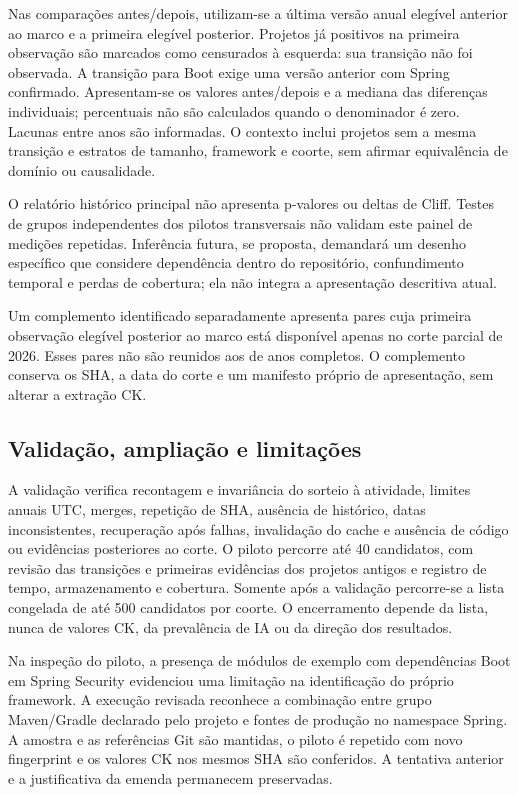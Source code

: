 Nas comparações antes/depois, utilizam-se a última versão anual elegível anterior ao marco e a primeira elegível posterior. Projetos já positivos na primeira observação são marcados como censurados à esquerda: sua transição não foi observada. A transição para Boot exige uma versão anterior com Spring confirmado. Apresentam-se os valores antes/depois e a mediana das diferenças individuais; percentuais não são calculados quando o denominador é zero. Lacunas entre anos são informadas. O contexto inclui projetos sem a mesma transição e estratos de tamanho, framework e coorte, sem afirmar equivalência de domínio ou causalidade.

O relatório histórico principal não apresenta p-valores ou deltas de Cliff. Testes de grupos independentes dos pilotos transversais não validam este painel de medições repetidas. Inferência futura, se proposta, demandará um desenho específico que considere dependência dentro do repositório, confundimento temporal e perdas de cobertura; ela não integra a apresentação descritiva atual.

Um complemento identificado separadamente apresenta pares cuja primeira observação elegível posterior ao marco está disponível apenas no corte parcial de 2026. Esses pares não são reunidos aos de anos completos. O complemento conserva os SHA, a data do corte e um manifesto próprio de apresentação, sem alterar a extração CK.

\subsection{Validação, ampliação e limitações}
\label{subsec:validacao-historica}

A validação verifica recontagem e invariância do sorteio à atividade, limites anuais UTC, merges, repetição de SHA, ausência de histórico, datas inconsistentes, recuperação após falhas, invalidação do cache e ausência de código ou evidências posteriores ao corte. O piloto percorre até 40 candidatos, com revisão das transições e primeiras evidências dos projetos antigos e registro de tempo, armazenamento e cobertura. Somente após a validação percorre-se a lista congelada de até 500 candidatos por coorte. O encerramento depende da lista, nunca de valores CK, da prevalência de IA ou da direção dos resultados.

Na inspeção do piloto, a presença de módulos de exemplo com dependências Boot em Spring Security evidenciou uma limitação na identificação do próprio framework. A execução revisada reconhece a combinação entre grupo Maven/Gradle declarado pelo projeto e fontes de produção no namespace Spring. A amostra e as referências Git são mantidas, o piloto é repetido com novo fingerprint e os valores CK nos mesmos SHA são conferidos. A tentativa anterior e a justificativa da emenda permanecem preservadas.

